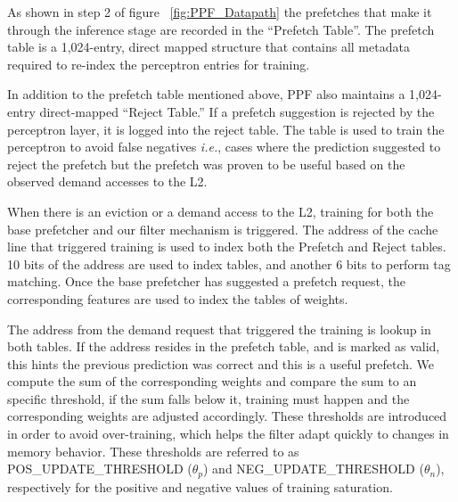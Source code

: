\newline 

As shown in step 2 of figure ~\ref{fig:PPF_Datapath}
the prefetches that make it through the inference stage are recorded in the 
``Prefetch Table''. The prefetch table is a 1,024-entry, direct mapped 
structure that contains all metadata required to re-index the perceptron 
entries for training. 

In addition to the prefetch table mentioned above, 
PPF also maintains a 1,024-entry direct-mapped ``Reject Table.'' 
If a prefetch suggestion is rejected by the perceptron layer, it is logged into 
the reject table. The table is used to train the perceptron to avoid false negatives 
\textit{i.e.}, cases where the prediction suggested to reject the prefetch 
but the prefetch was proven to be useful based 
on the observed demand accesses to the L2. \newline

 \newline

When there is an eviction or a demand access to the L2, training for both the base 
prefetcher and our filter mechanism is triggered. 
The address of the cache line that triggered training is used to index
both the Prefetch and Reject tables. 10 bits of the address are used to index 
tables, and another 6 bits to perform tag matching. 
Once the base prefetcher has suggested a prefetch request, the corresponding 
features are used to index the tables of weights. \newline


\newline

The address from the demand request that triggered the training is lookup in 
both tables. If the address resides in the prefetch table, and is marked 
as valid, this hints the previous prediction was correct and this is a useful
prefetch. We compute the sum of the corresponding weights and
compare the sum to an specific threshold, if the sum falls below it, 
training must happen and the corresponding weights are adjusted accordingly.
These thresholds are introduced in order to avoid over-training, 
which helps the filter adapt quickly to changes in memory behavior. 
These thresholds are referred to as
POS\_UPDATE\_THRESHOLD ($\theta_p$) and \newline
NEG\_UPDATE\_THRESHOLD ($\theta_n$),
respectively for the positive and negative values of training saturation.

